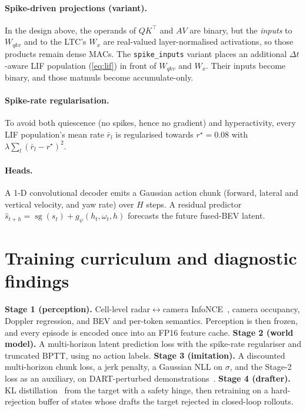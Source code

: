 \documentclass[12pt]{article}
\newcommand{\sg}{\operatorname{sg}}
\begin{document}
\paragraph{Spike-driven projections (variant).} In the design above, the operands of $QK^\top$ and $AV$ are binary, but the \emph{inputs} to $W_{qkv}$ and to the LTC's $W_x$ are real-valued layer-normalised activations, so those products remain dense MACs. The \texttt{spike\_inputs} variant places an additional $\Delta t$-aware LIF population (\eqref{eq:lif}) in front of $W_{qkv}$ and $W_x$. Their inputs become binary, and those matmuls become accumulate-only.

\paragraph{Spike-rate regularisation.} To avoid both quiescence (no spikes, hence no gradient) and hyperactivity, every LIF population's mean rate $\bar r_l$ is regularised towards $r^\star=0.08$ with $\lambda\sum_l(\bar r_l-r^\star)^2$.

\paragraph{Heads.} A 1-D convolutional decoder emits a Gaussian action chunk (forward, lateral and vertical velocity, and yaw rate) over $H$ steps. A residual predictor $\hat s_{t+h}=\sg(s_t)+g_\psi(h_t,\omega_t,h)$ forecasts the future fused-BEV latent.

\section{Training curriculum and diagnostic findings}\label{sec:training}
\textbf{Stage 1 (perception).} Cell-level radar$\leftrightarrow$camera InfoNCE~\citep{oord2018cpc}, camera occupancy, Doppler regression, and BEV and per-token semantics. Perception is then frozen, and every episode is encoded once into an FP16 feature cache.
\textbf{Stage 2 (world model).} A multi-horizon latent prediction loss with the spike-rate regulariser and truncated BPTT, using no action labels.
\textbf{Stage 3 (imitation).} A discounted multi-horizon chunk loss, a jerk penalty, a Gaussian NLL on $\sigma$, and the Stage-2 loss as an auxiliary, on DART-perturbed demonstrations~\citep{laskey2017dart}.
\textbf{Stage 4 (drafter).} KL distillation~\citep{hinton2015distilling} from the target with a safety hinge, then retraining on a hard-rejection buffer of states whose drafts the target rejected in closed-loop rollouts.
\end{document}

